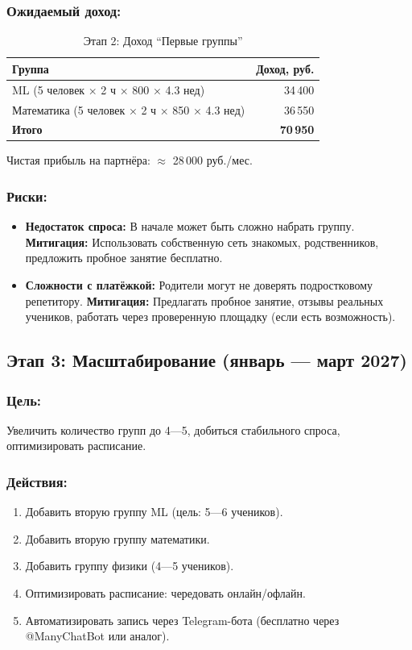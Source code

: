 \documentclass[12pt,a4paper]{article}
\begin{document}
\subsubsection*{Ожидаемый доход:}
\begin{table}[H]
\centering
\caption{Этап 2: Доход ``Первые группы''}
\begin{tabular}{lr}
\toprule
Группа & Доход, руб. \\
\midrule
ML (5 человек × 2 ч × 800 × 4.3 нед) & 34\,400 \\
Математика (5 человек × 2 ч × 850 × 4.3 нед) & 36\,550 \\
\midrule
\textbf{Итого} & \textbf{70\,950} \\
\bottomrule
\end{tabular}
\end{table}

Чистая прибыль на партнёра: ${\approx}$ 28\,000 руб./мес.

\subsubsection*{Риски:}
\begin{itemize}
  \item \textbf{Недостаток спроса:} В начале может быть сложно набрать группу. \textbf{Митигация:} Использовать собственную сеть знакомых, родственников, предложить пробное занятие бесплатно.
  \item \textbf{Сложности с платёжкой:} Родители могут не доверять подростковому репетитору. \textbf{Митигация:} Предлагать пробное занятие, отзывы реальных учеников, работать через проверенную площадку (если есть возможность).
\end{itemize}

\subsection{Этап 3: Масштабирование (январь --- март 2027)}

\subsubsection*{Цель:}
Увеличить количество групп до 4---5, добиться стабильного спроса, оптимизировать расписание.

\subsubsection*{Действия:}
\begin{enumerate}
  \item Добавить вторую группу ML (цель: 5---6 учеников).
  \item Добавить вторую группу математики.
  \item Добавить группу физики (4---5 учеников).
  \item Оптимизировать расписание: чередовать онлайн/офлайн.
  \item Автоматизировать запись через Telegram-бота (бесплатно через @ManyChatBot или аналог).
\end{enumerate}
\end{document}
